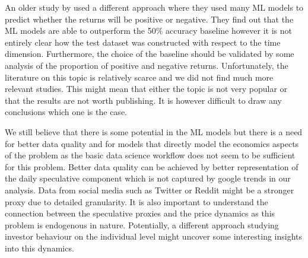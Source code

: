 An older study by \cite{Akyildirim2020} 
used a different approach 
where they used many \ac{ML} models to predict
whether the returns will be positive or negative. 
They find out that the \ac{ML} models are able to outperform 
the 50\% accuracy baseline however 
it is not entirely clear how the test dataset was constructed with
respect to the time dimension. Furthermore, 
the choice of the baseline should be validated
by some analysis of the proportion of positive and negative returns.
Unfortunately, the literature on
this topic is relatively scarce and we did not find 
much more relevant studies. This might mean
that either the topic is not very popular or that the results are not worth
publishing. It is however difficult to draw any conclusions which one is the case.

We still believe that there is some potential in the \ac{ML} models
but there is a need for better data quality and for models
that directly model the economics aspects of the problem
as the basic data science workflow does not seem 
to be sufficient for this problem. Better data quality can
be achieved by better
representation of the daily speculative component
which is not captured by google trends in our analysis.
Data from social media such as Twitter or Reddit might
be a stronger proxy due to detailed granularity. It is
also important to understand the connection between the 
speculative proxies and the price dynamics as this problem
is endogenous in nature. Potentially, a different approach
studying investor behaviour on the individual level
might uncover some interesting insights into this dynamics.




